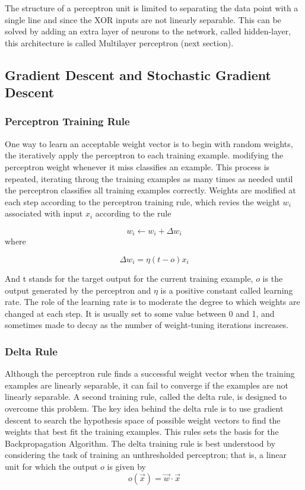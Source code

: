 \documentclass{article}
\begin{document}
The structure of a perceptron unit is limited to separating the data point with a single line and since the XOR inputs are not linearly separable. This can be solved by adding an extra layer of neurons to the network, called hidden-layer, this architecture is called Multilayer perceptron (next section). 
    

\subsection{Gradient Descent and Stochastic Gradient Descent}
\subsubsection{Perceptron Training Rule}
One way to learn an acceptable weight vector is to begin with random weights, the  iteratively apply the perceptron to each training example. modifying the perceptron weight whenever it miss classifies an example. This process is repeated, iterating throug the training examples as many times as needed until the perceptron classifies all training examples correctly. Weights are modified at each step according to the perceptron training rule, which revies the weight $w_i$ associated with input $x_i$ according to the rule

\begin{equation}
    w_i \leftarrow w_i + \Delta w_i
\end{equation}
where

\begin{equation}
    \Delta w_i = \eta (t - o)x_i
\end{equation}

And t stands for the target output for the current training example, $o$ is the output generated by the perceptron and $\eta$ is a positive constant called learning rate. The role of the learning rate is to moderate the degree to which weights are changed at each step. It is usually set to some value between 0 and 1, and sometimes made to decay as the number of weight-tuning iterations increases.

\subsubsection{Delta Rule}
Although the perceptron rule finds a successful weight vector when the training examples are linearly separable, it can fail to converge if the examples are not linearly separable. A second training rule, called the delta rule, is designed to overcome this problem.
The key idea behind the delta rule is to use gradient descent to search the hypothesis space of possible weight vectors to find the weights that best fit the training examples. This rules sets the basis for the Backpropagation Algorithm.
The delta training rule is best understood by considering the task of training an unthresholded perceptron; that is, a linear unit for which the output $o$ is given by
\begin{equation}
    o(\Vec{x}) = \Vec{w} \cdot \Vec{x}
\end{equation}
\end{document}
